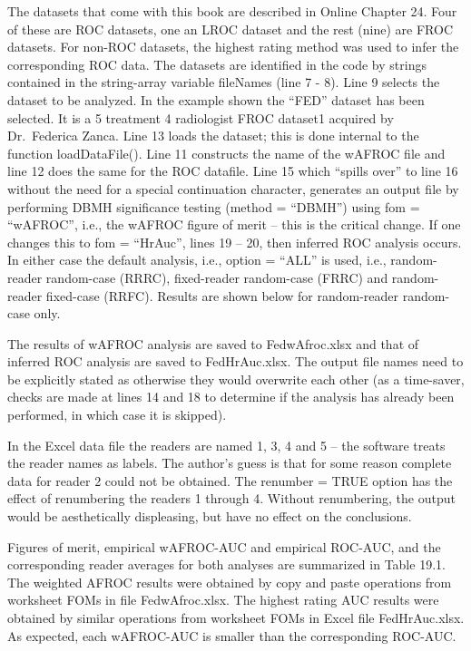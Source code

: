 \documentclass[
]{book}
\begin{document}
The datasets that come with this book are described in Online Chapter 24. Four of these are ROC datasets, one an LROC dataset and the rest (nine) are FROC datasets. For non-ROC datasets, the highest rating method was used to infer the corresponding ROC data. The datasets are identified in the code by strings contained in the string-array variable fileNames (line 7 - 8). Line 9 selects the dataset to be analyzed. In the example shown the ``FED'' dataset has been selected. It is a 5 treatment 4 radiologist FROC dataset1 acquired by Dr.~Federica Zanca. Line 13 loads the dataset; this is done internal to the function loadDataFile(). Line 11 constructs the name of the wAFROC file and line 12 does the same for the ROC datafile. Line 15 which ``spills over'' to line 16 without the need for a special continuation character, generates an output file by performing DBMH significance testing (method = ``DBMH'') using fom = ``wAFROC'', i.e., the wAFROC figure of merit -- this is the critical change. If one changes this to fom = ``HrAuc'', lines 19 -- 20, then inferred ROC analysis occurs. In either case the default analysis, i.e., option = ``ALL'' is used, i.e., random-reader random-case (RRRC), fixed-reader random-case (FRRC) and random-reader fixed-case (RRFC). Results are shown below for random-reader random-case only.

The results of wAFROC analysis are saved to FedwAfroc.xlsx and that of inferred ROC analysis are saved to FedHrAuc.xlsx. The output file names need to be explicitly stated as otherwise they would overwrite each other (as a time-saver, checks are made at lines 14 and 18 to determine if the analysis has already been performed, in which case it is skipped).

In the Excel data file the readers are named 1, 3, 4 and 5 -- the software treats the reader names as labels. The author's guess is that for some reason complete data for reader 2 could not be obtained. The renumber = TRUE option has the effect of renumbering the readers 1 through 4. Without renumbering, the output would be aesthetically displeasing, but have no effect on the conclusions.

Figures of merit, empirical wAFROC-AUC and empirical ROC-AUC, and the corresponding reader averages for both analyses are summarized in Table 19.1. The weighted AFROC results were obtained by copy and paste operations from worksheet FOMs in file FedwAfroc.xlsx. The highest rating AUC results were obtained by similar operations from worksheet FOMs in Excel file FedHrAuc.xlsx. As expected, each wAFROC-AUC is smaller than the corresponding ROC-AUC.
\end{document}
